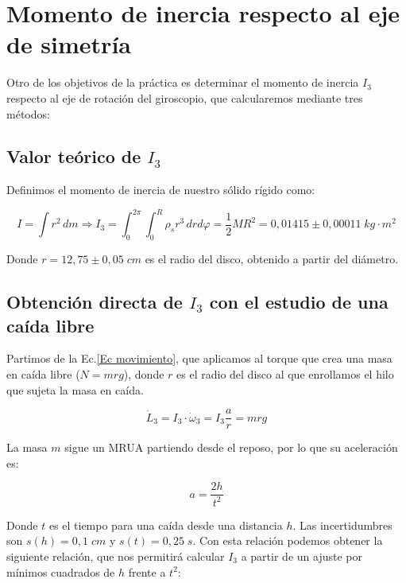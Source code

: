 \documentclass[a4paper,12pt,titlepage]{article}
\begin{document}
\newpage

\section{Momento de inercia respecto al eje de simetría}

Otro de los objetivos de la práctica es determinar el momento de inercia $I_3$ respecto al eje de rotación del giroscopio, que calcularemos mediante tres métodos:

\subsection{Valor teórico de $I_3$}

Definimos el momento de inercia de nuestro sólido rígido como:

\begin{equation}
    I = \int r^2 \,dm \Rightarrow I_3 = \int_{0}^{2\pi}\int_{0}^{R} \rho_s r^3\,drd\varphi = \frac{1}{2}MR^2 = 0,01415\pm 0,00011 \;kg\cdot m^2
\end{equation}

Donde $r = 12,75\pm 0,05 \;cm$ es el radio del disco, obtenido a partir del diámetro.

\subsection{Obtención directa de $I_3$ con el estudio de una caída libre}

Partimos de la Ec.\ref{Ec movimiento}, que aplicamos al torque que crea una masa en caída libre ($N=mrg$), donde $r$ es el radio del disco al que enrollamos el hilo que sujeta la masa en caída. 

\begin{equation}
    \dot{L}_3 = I_3\cdot \dot{\omega}_3 = I_3\frac{a}{r}=mrg
\end{equation}

La masa $m$ sigue un MRUA partiendo desde el reposo, por lo que su aceleración es:

\begin{equation}
    a = \frac{2h}{t^2}
\end{equation}

Donde $t$ es el tiempo para una caída desde una distancia $h$. Las incertidumbres son \newline$s(h)=0,1\;cm$ y $s(t)=0,25\;s$. Con esta relación podemos obtener la siguiente relación, que nos permitirá calcular $I_3$ a partir de un ajuste por mínimos cuadrados de $h$ frente a $t^2$:
\end{document}

